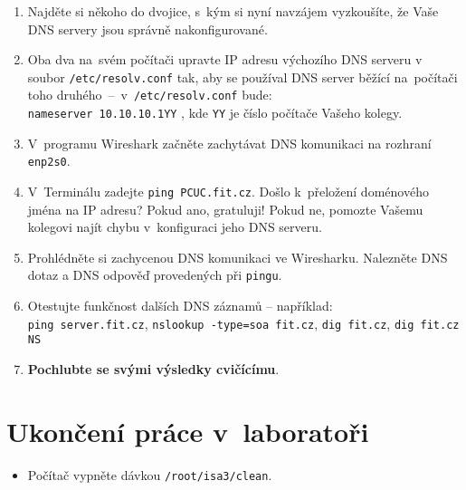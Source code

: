 \begin{enumerate}
  \item Najděte si někoho do dvojice, s~kým si nyní navzájem vyzkoušíte, že Vaše DNS servery jsou správně nakonfigurované.
  \item Oba dva na~svém počítači upravte IP adresu výchozího DNS serveru v soubor {\tt /etc/resolv.conf} tak, aby se
    používal DNS server běžící na~počítači toho druhého~--~v~{\tt /etc/resolv.conf} bude: \\
    {\tt nameserver 10.10.10.1YY} , kde {\tt YY} je číslo počítače Vašeho kolegy.
  \item V~programu Wireshark začněte zachytávat DNS komunikaci na rozhraní {\tt enp2s0}.
  \item V~Terminálu zadejte {\tt ping PCUC.fit.cz}. Došlo k~přeložení doménového jména na IP adresu? Pokud ano, gratuluji! Pokud ne, pomozte Vašemu kolegovi najít chybu
    v~konfiguraci jeho DNS serveru.
  \item Prohlédněte si zachycenou DNS komunikaci ve Wiresharku. Nalezněte DNS dotaz a DNS odpověď provedených při {\tt pingu}.
  \item Otestujte funkčnost dalších DNS záznamů -- například:\\
        {\tt ping server.fit.cz}, {\tt nslookup -type=soa fit.cz}, {\tt dig fit.cz}, {\tt dig fit.cz NS}
  \item {\bf Pochlubte se svými výsledky cvičícímu}.
\end{enumerate}




\section{Ukončení práce v~laboratoři}
\begin{itemize}
  \item Počítač vypněte dávkou {\tt /root/isa3/clean}.
\end{itemize}

